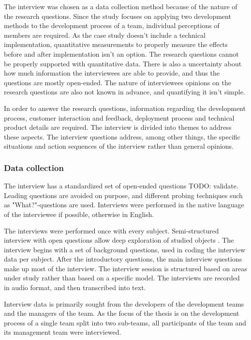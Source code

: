 \documentclass[english]{tktltiki2}
\theoremstyle{definition}
\theoremstyle{remark}
\begin{document}
The interview was chosen as a data collection method because of the nature of the research questions. Since the study focuses on applying two development methods to the development process of a team, individual perceptions of members are required. As the case study doesn't include a technical implementation, quantitative measurements to properly measure the effects before and after implementation isn't an option. The research questions cannot be properly supported with quantitative data. There is also a uncertainty about how much information the interviewees are able to provide, and thus the questions are mostly open-ended. The nature of interviewees opinions on the research questions are also not known in advance, and quantifying it isn't simple. 

In order to answer the research questions, information regarding the development process, customer interaction and feedback, deployment process and technical product details are required. The interview is divided into themes to address these aspects. The interview questions address, among other things, the specific situations and action sequences of the interview rather than general opinions. 

\subsubsection{Data collection}
The interview has a standardized set of open-ended questions TODO: validate. Leading questions are avoided on purpose, and different probing techniques such as "What?"-questions are used.    
Interviews were performed in the native language of the interviewee if possible, otherwise in English.

The interviews were performed once with every subject. Semi-structured interview with open questions allow deep exploration of studied objects \cite{runeson2009guidelines}. The interview begins with a set of background questions, used in coding the interview data per subject. After the introductory questions, the main interview questions make up most of the interview. The interview session is structured based on areas under study rather than based on a specific model. The interviews are recorded in audio format, and then transcribed into text.   

Interview data is primarily sought from the developers of the development teams and the managers of the team. As the focus of the thesis is on the development process of a single team split into two sub-teams, all participants of the team and its management team were interviewed. 
\end{document}
